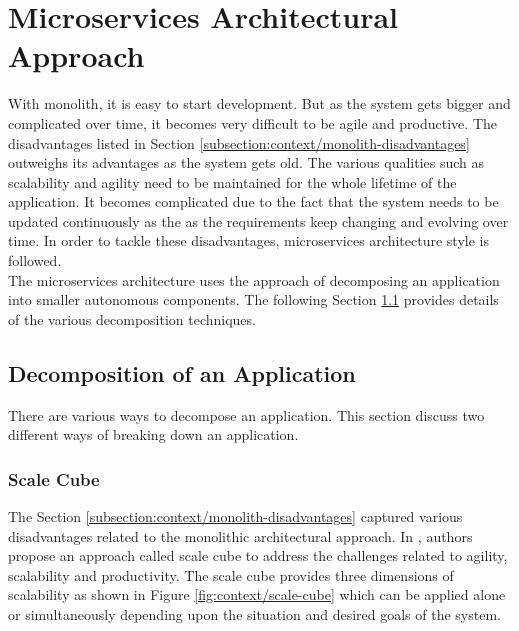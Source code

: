 \section{Microservices Architectural Approach}\label{section:context/microservices_architecture_style}
With monolith, it is easy to start development. But as the system gets bigger and complicated over time, it becomes very difficult to be agile and productive. The disadvantages listed in Section \ref{subsection:context/monolith-disadvantages} outweighs its advantages as the system gets old. The various qualities such as scalability and agility need to be maintained for the whole lifetime of the application. It becomes complicated due to the fact that the system needs to be updated continuously as the as the requirements keep changing and evolving over time. In order to tackle these disadvantages, microservices architecture style is followed.\\
The microservices architecture uses the approach of decomposing an application into smaller autonomous components. The following Section \ref{section:context/microservices_architecture_style/decompostion_of_an_application} provides details of the various decomposition techniques.

\subsection{Decomposition of an Application}\label{section:context/microservices_architecture_style/decompostion_of_an_application}
There are various ways to decompose an application. This section discuss two different ways of breaking down an application.

\subsubsection{Scale Cube}\label{section:context/microservices_architecture_style/decompostion_of_an_application/scale_cube}
The Section \ref{subsection:context/monolith-disadvantages} captured various disadvantages related to the monolithic architectural approach. In \cite{Fisher:2015aa}, authors propose an approach called scale cube to address the challenges related to agility, scalability and productivity. The scale cube provides three dimensions of scalability as shown in Figure \ref{fig:context/scale-cube} which can be applied alone or simultaneously depending upon the situation and desired goals of the system.

